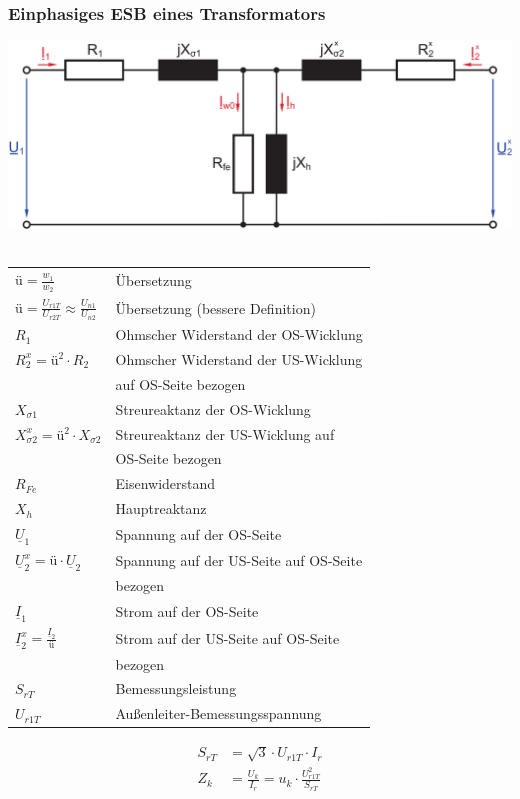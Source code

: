 \documentclass[a4paper,twocolumn,10pt]{article}
\begin{document}
\subsubsection{Einphasiges ESB eines Transformators}
\includegraphics[width=0.9\columnwidth]{Grafiken/Trafo_ESB}\\\\
\begin{tabular}{ll}
$\text{ü}=\frac{w_1}{w_2}$ & Übersetzung\\
$\text{ü}=\frac{U_{r1T}}{U_{r2T}}\approx\frac{U_{n1}}{U_{n2}}$ & Übersetzung (bessere Definition)\\
$R_1$ & Ohmscher Widerstand der OS-Wicklung\\
$R_2^x=\text{ü}^2\cdot R_2$ & Ohmscher Widerstand der US-Wicklung\\
& auf OS-Seite bezogen\\
$X_{\sigma 1}$ & Streureaktanz der OS-Wicklung\\
$X_{\sigma2}^x=\text{ü}^2\cdot X_{\sigma 2}$ & Streureaktanz der US-Wicklung auf\\
&OS-Seite bezogen\\
$R_{Fe}$ & Eisenwiderstand\\
$X_h$ & Hauptreaktanz\\
$\underline{U}_1$ & Spannung auf der OS-Seite\\
$\underline{U}_2^x=\text{ü}\cdot\underline{U}_2$ & Spannung auf der US-Seite auf OS-Seite\\
& bezogen\\
$\underline{I}_1$ & Strom auf der OS-Seite\\
$\underline{I}_2^x=\frac{\underline{I}_2}{\text{ü}}$ & Strom auf der US-Seite auf OS-Seite\\
& bezogen\\
$S_{rT}$ & Bemessungsleistung\\
$U_{r1T}$ & Außenleiter-Bemessungsspannung
\end{tabular}
\begin{equation*}
\begin{split}
S_{rT}&=\sqrt{3}\cdot U_{r1T}\cdot I_r\\
Z_k&=\frac{U_k}{I_r}=u_k\cdot\frac{U_{r1T}^2}{S_{rT}}
\end{split}
\end{equation*}
\end{document}
